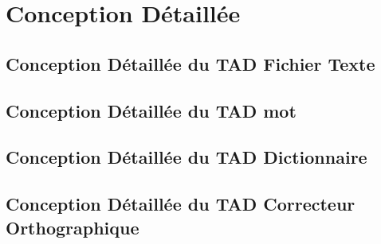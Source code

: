 \section{Conception Détaillée}
	\subsection{Conception Détaillée du TAD Fichier Texte}
		
		
	\subsection{Conception Détaillée du TAD mot}
		
		
	\subsection{Conception Détaillée du TAD Dictionnaire}
		
	\newpage
	\subsection{Conception Détaillée du TAD Correcteur Orthographique}
		
		
